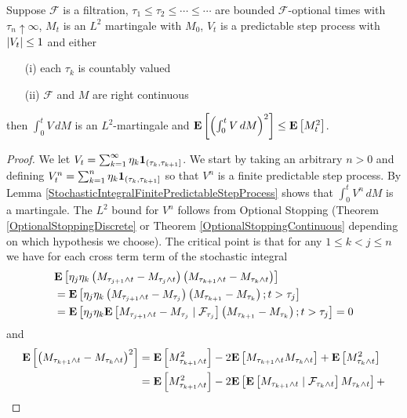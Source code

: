 \begin{lem}\label{StochasticIntegralPredictableStepProcess}Suppose $\mathcal{F}$ is a filtration,  $\tau_1 \leq \tau_2 \leq \dotsb \leq \dotsb$ are bounded $\mathcal{F}$-optional times with $\tau_n \uparrow \infty$, $M_t$ is an $L^2$ martingale with $M_0$, $V_t$ is a predictable step process with $\abs{V_t} \leq 1$ and either
\begin{itemize}
\item[(i)] each $\tau_k$ is countably valued
\item[(ii)]$\mathcal{F}$ and $M$ are right continuous
\end{itemize}
then $\int_0^t V \, dM$ is an $L^2$-martingale and $\expectation{\left(\int_0^t V \, dM\right)^2} \leq \expectation{M^2_t}$.
\end{lem}
\begin{proof}
We let $V_t = \sum_{k=1}^\infty \eta_k \characteristic{(\tau_k, \tau_{k+1}]}$.  We start by taking an arbitrary $n >0$ and defining $V^n_t =  \sum_{k=1}^n \eta_k \characteristic{(\tau_k, \tau_{k+1}]}$ so that $V^n$ is a finite predictable step process.  By Lemma \ref{StochasticIntegralFinitePredictableStepProcess} shows that $\int_0^t V^n \, dM$ is a martingale.  The $L^2$ bound for $V^n$ follows from Optional Stopping (Theorem \ref{OptionalStoppingDiscrete} or Theorem \ref{OptionalStoppingContinuous} depending on which hypothesis we choose).  The critical point is that for any $1 \leq k < j \leq n$ we have for each cross term term of the stochastic integral
\begin{align*}
&\expectation{\eta_j \eta_k \left (M_{\tau_{j+1} \wedge t} - M_{\tau_j \wedge t} \right)  \left (M_{\tau_{k+1} \wedge t} - M_{\tau_k \wedge t} \right)} \\
&=\expectation{\eta_j \eta_k \left (M_{\tau_{j+1} \wedge t} - M_{\tau_j} \right)  \left (M_{\tau_{k+1} } - M_{\tau_k} \right) ; t > \tau_j} \\
&=\expectation{ \eta_j \eta_k \cexpectationlong{\mathcal{F}_{\tau_j}}{M_{\tau_{j+1} \wedge t} - M_{\tau_j }}  \left(M_{\tau_{k+1} } - M_{\tau_k} \right) ; t > \tau_j} =0
\end{align*}
and 
\begin{align*}
\expectation{ \left (M_{\tau_{k+1} \wedge t} - M_{\tau_k \wedge t} \right)^2} &= \expectation{M^2_{\tau_{k+1} \wedge t}} - 2\expectation{M_{\tau_{k+1} \wedge t}M_{\tau_{k} \wedge t}} + 
\expectation{M^2_{\tau_k \wedge t}} \\
&=\expectation{M^2_{\tau_{k+1} \wedge t}} - 2\expectation{\cexpectationlong{\mathcal{F}_{\tau_k \wedge t}}{M_{\tau_{k+1} \wedge t}}M_{\tau_{k} \wedge t}} + 

\end{align*}
\end{proof}
